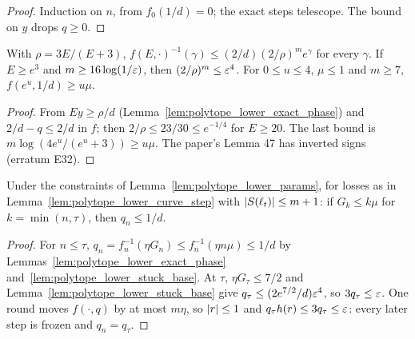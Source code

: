 \begin{proof}
  \leanok
  Induction on $n$, from $f_0(1/d) = 0$; the exact steps telescope. The bound on $y$ drops $q \ge 0$.
\end{proof}

\begin{lemma}
  \label{lem:polytope_lower_stuck_base}
  \leanok
  With $\rho = 3E/(E + 3)$, $f(E, \cdot)^{-1}(\gamma) \le (2/d)(2/\rho)^m e^\gamma$ for every
  $\gamma$. If $E \ge e^3$ and $m \ge 16\log(1/\varepsilon)$, then $(2/\rho)^m \le \varepsilon^4$. For
  $0 \le u \le 4$, $\mu \le 1$ and $m \ge 7$, $f(e^u, 1/d) \ge u\mu$.
\end{lemma}

\begin{proof}
  \leanok
  From $Ey \ge \rho/d$ (Lemma~\ref{lem:polytope_lower_exact_phase}) and $2/d - q \le 2/d$ in $f$;
  then $2/\rho \le 23/30 \le e^{-1/4}$ for $E \ge 20$. The last bound is
  $m\log(4e^u/(e^u + 3)) \ge u\mu$. The paper's Lemma 47 has inverted signs (erratum E32).
\end{proof}

\begin{lemma}
  \label{lem:polytope_lower_stuck}
  \leanok
  Under the constraints of Lemma~\ref{lem:polytope_lower_params}, for losses as in
  Lemma~\ref{lem:polytope_lower_curve_step} with $\lvert S(\ell_t) \rvert \le m + 1$: if $G_k \le k\mu$ for
  $k = \min(n, \tau)$, then $q_n \le 1/d$.
\end{lemma}

\begin{proof}
  \leanok
  For $n \le \tau$, $q_n = f_n^{-1}(\eta G_n) \le f_n^{-1}(\eta n\mu) \le 1/d$ by
  Lemmas~\ref{lem:polytope_lower_exact_phase} and~\ref{lem:polytope_lower_stuck_base}. At $\tau$,
  $\eta G_\tau \le 7/2$ and Lemma~\ref{lem:polytope_lower_stuck_base} give
  $q_\tau \le (2e^{7/2}/d)\varepsilon^4$, so $3q_\tau \le \varepsilon$. One round moves $f(\cdot, q)$ by at most
  $m\eta$, so $\lvert r \rvert \le 1$ and $q_\tau h(r) \le 3q_\tau \le \varepsilon$: every later step is frozen and
  $q_n = q_\tau$.
\end{proof}

